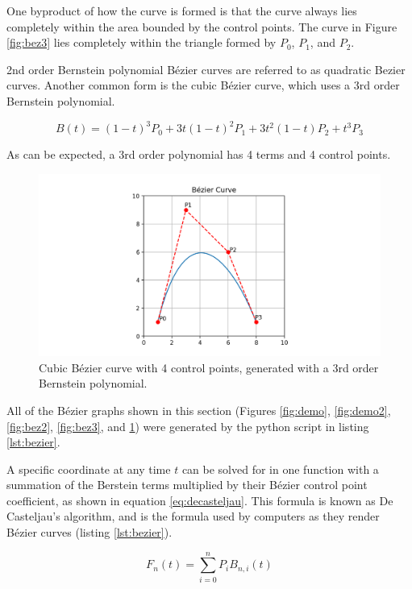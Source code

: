 \documentclass[12pt,letterpaper]{article}
\begin{document}
One byproduct of how the curve is formed is that the curve always lies completely within the area bounded by the control points. The curve in Figure \ref{fig:bez3} lies completely within the triangle formed by $P_0$, $P_1$, and $P_2$.

2nd order Bernstein polynomial B\'ezier curves are referred to as quadratic Bezier curves. Another common form is the cubic B\'ezier curve, which uses a 3rd order Bernstein polynomial.

$$B(t)=(1-t)^3 P_0+3t (1-t)^2 P_1+3t^2 (1-t) P_2+t^3 P_3$$

As can be expected, a 3rd order polynomial has 4 terms and 4 control points.

\begin{figure}[H]
    \centering
    \includegraphics[width=15cm]{Figure_5}
    \caption{Cubic B\'ezier curve with 4 control points, generated with a 3rd order Bernstein polynomial.}
    \label{fig:bez4}
\end{figure}

All of the B\'ezier graphs shown in this section (Figures \ref{fig:demo}, \ref{fig:demo2}, \ref{fig:bez2}, \ref{fig:bez3}, and \ref{fig:bez4}) were generated by the python script in listing \ref{lst:bezier}.

A specific coordinate at any time $t$ can be solved for in one function with a summation of the Berstein terms multiplied by their B\'ezier control point coefficient, as shown in equation \ref{eq:decasteljau}. This formula is known as De Casteljau's algorithm, and is the formula used by computers as they render B\'ezier curves (listing \ref{lst:bezier}).

\begin{equation}
	\label{eq:decasteljau}
	F_{n}(t) = \sum_{i=0}^{n} P_{i} B_{n,i}(t)
\end{equation}
\end{document}
